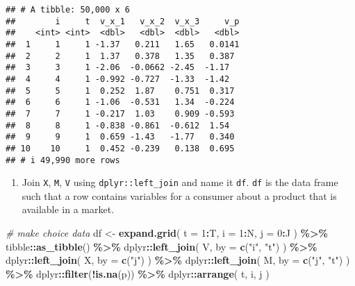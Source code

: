 \documentclass[
]{book}
\newenvironment{Shaded}{\begin{snugshade}}{\end{snugshade}}
\newcommand{\AttributeTok}[1]{\textcolor[rgb]{0.13,0.29,0.53}{#1}}
\newcommand{\CommentTok}[1]{\textcolor[rgb]{0.56,0.35,0.01}{\textit{#1}}}
\newcommand{\DecValTok}[1]{\textcolor[rgb]{0.00,0.00,0.81}{#1}}
\newcommand{\FunctionTok}[1]{\textcolor[rgb]{0.13,0.29,0.53}{\textbf{#1}}}
\newcommand{\NormalTok}[1]{#1}
\newcommand{\OtherTok}[1]{\textcolor[rgb]{0.56,0.35,0.01}{#1}}
\newcommand{\SpecialCharTok}[1]{\textcolor[rgb]{0.81,0.36,0.00}{\textbf{#1}}}
\newcommand{\StringTok}[1]{\textcolor[rgb]{0.31,0.60,0.02}{#1}}
\providecommand{\tightlist}{%
  \setlength{\itemsep}{0pt}\setlength{\parskip}{0pt}}
\begin{document}
\begin{verbatim}
## # A tibble: 50,000 x 6
##        i     t  v_x_1   v_x_2  v_x_3     v_p
##    <int> <int>  <dbl>   <dbl>  <dbl>   <dbl>
##  1     1     1 -1.37   0.211   1.65   0.0141
##  2     2     1  1.37   0.378   1.35   0.387 
##  3     3     1 -2.06  -0.0662 -2.45  -1.17  
##  4     4     1 -0.992 -0.727  -1.33  -1.42  
##  5     5     1  0.252  1.87    0.751  0.317 
##  6     6     1 -1.06  -0.531   1.34  -0.224 
##  7     7     1 -0.217  1.03    0.909 -0.593 
##  8     8     1 -0.838 -0.861  -0.612  1.54  
##  9     9     1  0.659 -1.43   -1.77   0.340 
## 10    10     1  0.452 -0.239   0.138  0.695 
## # i 49,990 more rows
\end{verbatim}

\begin{enumerate}
\def\labelenumi{\arabic{enumi}.}
\setcounter{enumi}{4}
\tightlist
\item
  Join \texttt{X}, \texttt{M}, \texttt{V} using \texttt{dplyr::left\_join} and name it \texttt{df}. \texttt{df} is the data frame such that a row contains variables for a consumer about a product that is available in a market.
\end{enumerate}

\begin{Shaded}
\begin{Highlighting}[]
\CommentTok{\# make choice data}
\NormalTok{df }\OtherTok{\textless{}{-}} 
  \FunctionTok{expand.grid}\NormalTok{(}
    \AttributeTok{t =} \DecValTok{1}\SpecialCharTok{:}\NormalTok{T, }
    \AttributeTok{i =} \DecValTok{1}\SpecialCharTok{:}\NormalTok{N, }
    \AttributeTok{j =} \DecValTok{0}\SpecialCharTok{:}\NormalTok{J}
\NormalTok{    ) }\SpecialCharTok{\%\textgreater{}\%}
\NormalTok{    tibble}\SpecialCharTok{::}\FunctionTok{as\_tibble}\NormalTok{() }\SpecialCharTok{\%\textgreater{}\%}
\NormalTok{    dplyr}\SpecialCharTok{::}\FunctionTok{left\_join}\NormalTok{(}
\NormalTok{      V, }
      \AttributeTok{by =} \FunctionTok{c}\NormalTok{(}\StringTok{"i"}\NormalTok{, }\StringTok{"t"}\NormalTok{)}
\NormalTok{      ) }\SpecialCharTok{\%\textgreater{}\%}
\NormalTok{    dplyr}\SpecialCharTok{::}\FunctionTok{left\_join}\NormalTok{(}
\NormalTok{      X, }
      \AttributeTok{by =} \FunctionTok{c}\NormalTok{(}\StringTok{"j"}\NormalTok{)}
\NormalTok{      ) }\SpecialCharTok{\%\textgreater{}\%}
\NormalTok{    dplyr}\SpecialCharTok{::}\FunctionTok{left\_join}\NormalTok{(}
\NormalTok{      M, }
      \AttributeTok{by =} \FunctionTok{c}\NormalTok{(}\StringTok{"j"}\NormalTok{, }\StringTok{"t"}\NormalTok{)}
\NormalTok{      ) }\SpecialCharTok{\%\textgreater{}\%}
\NormalTok{    dplyr}\SpecialCharTok{::}\FunctionTok{filter}\NormalTok{(}\SpecialCharTok{!}\FunctionTok{is.na}\NormalTok{(p)) }\SpecialCharTok{\%\textgreater{}\%}
\NormalTok{    dplyr}\SpecialCharTok{::}\FunctionTok{arrange}\NormalTok{(}
\NormalTok{      t, }
\NormalTok{      i, }
\NormalTok{      j}
\NormalTok{      )}
\end{Highlighting}
\end{Shaded}
\end{document}
